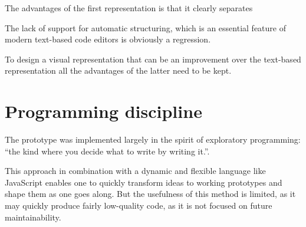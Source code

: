 The advantages of the first representation is that it clearly separates

The lack of support for automatic structuring, which is an essential feature of
modern text-based code editors is obviously a regression.

To design a visual representation that can be an improvement over the text-based
representation all the advantages of the latter need to be kept.


\section{Programming discipline}
The prototype was implemented largely in the spirit of exploratory programming:
``the kind where you decide what to write by writing
it.''\cite{arc}.

This approach in combination with a dynamic and flexible language like
JavaScript enables one to quickly transform ideas to working prototypes and
shape them as one goes along. But the usefulness of this method is limited, as
it may quickly produce fairly low-quality code, as it is not focused on future
maintainability.
